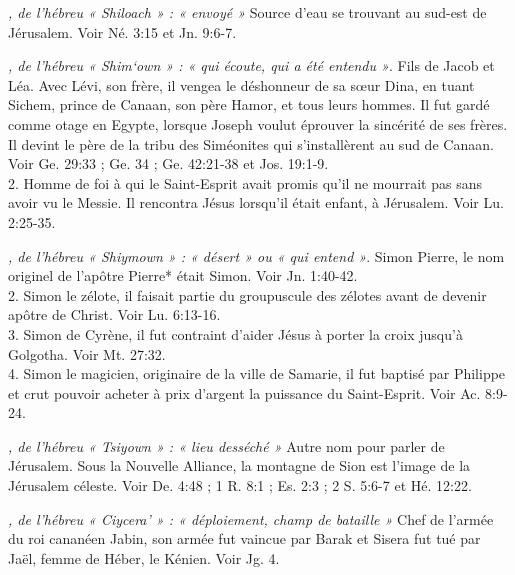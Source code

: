 \begin{multicols}{2}
{\textit{, de l'hébreu « Shiloach » : « envoyé »}\newline
Source d'eau se trouvant au sud-est de Jérusalem. Voir Né. 3:15 et Jn. 9:6-7.

\textit{, de l'hébreu « Shim`own » : « qui écoute, qui a été entendu »}. Fils de Jacob et Léa. Avec Lévi, son frère, il vengea le déshonneur de sa sœur Dina, en tuant Sichem, prince de Canaan, son père Hamor, et tous leurs hommes. Il fut gardé comme otage en Egypte, lorsque Joseph voulut éprouver la sincérité de ses frères. Il devint le père de la tribu des Siméonites qui s'installèrent au sud de Canaan. Voir Ge. 29:33 ; Ge. 34 ; Ge. 42:21-38 et Jos. 19:1-9.
\\2. Homme de foi à qui le Saint-Esprit avait promis qu'il ne mourrait pas sans avoir vu le Messie. Il rencontra Jésus lorsqu'il était enfant, à Jérusalem. Voir Lu. 2:25-35.

\textit{, de l'hébreu « Shiymown » : « désert » ou « qui entend »}. Simon Pierre, le nom originel de l'apôtre Pierre* était Simon. Voir Jn. 1:40-42.
\\2. Simon le zélote, il faisait partie du groupuscule des zélotes avant de devenir apôtre de Christ. Voir Lu. 6:13-16.
\\3. Simon de Cyrène, il fut contraint d'aider Jésus à porter la croix jusqu'à Golgotha. Voir Mt. 27:32.
\\4. Simon le magicien, originaire de la ville de Samarie, il fut baptisé par Philippe et crut pouvoir acheter à prix d'argent la puissance du Saint-Esprit. Voir Ac. 8:9-24.

\textit{, de l'hébreu « Tsiyown » : « lieu desséché »}\newline
Autre nom pour parler de Jérusalem. Sous la Nouvelle Alliance, la montagne de Sion est l'image de la Jérusalem céleste. Voir De. 4:48 ; 1 R. 8:1 ; Es. 2:3 ; 2 S. 5:6-7 et Hé. 12:22.

\textit{, de l'hébreu « Ciycera' » : « déploiement, champ de bataille »}\newline
Chef de l'armée du roi cananéen Jabin, son armée fut vaincue par Barak et Sisera fut tué par Jaël, femme de Héber, le Kénien. Voir Jg. 4.

}
\end{multicols}
